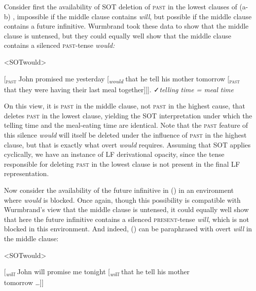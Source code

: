 \documentclass[output=paper]{langscibook}
\begin{document}
Consider first the availability of SOT deletion of \textsc{past }in the lowest clauses of (a-b) , impossible if the middle clause contains \textit{will}, but possible if the middle clause contains a future infinitive. Wurmbrand took these data to show that the middle clause is untensed, but they could equally well show that the middle clause contains a silenced \textsc{past}-tense \textit{would:}

\noindent \noindent \pex<SOTwould>

{[}\textsubscript{\textsc{past}} John promised me yesterday {[}\textsubscript{\textit{would}} that he  tell his mother tomorrow {[}\textsubscript{\textsc{past}} that they were having their last meal together{]]]}. \smallbreak
✓\textit{telling time = meal time}
\xe

On this view, it is \textsc{past} in the middle clause, not \textsc{past }in the highest cause, that deletes \textsc{past }in the lowest clause, yielding the SOT interpretation under which the telling time and the meal-eating time are identical. Note that the \textsc{past }feature of this silence \textit{would} will itself be deleted under the influence of \textsc{past} in the highest clause, but that is exactly what overt \textit{would} requires. Assuming that SOT applies cyclically, we have an instance of LF derivational opacity, since the tense responsible for deleting \textsc{past }in the lowest clause is not present in the final LF representation. 

Now consider the availability of the future infinitive in () in an environment where \textit{would} is blocked. Once again, though this possibility is compatible with Wurmbrand's view that the middle clause is untensed, it could equally well show that here the future infinitive contains a silenced \textsc{present-}tense \textit{will}, which is not blocked in this environment. And indeed, () can be paraphrased with overt \textit{will} in the middle clause:

\pex<SOTwould>

{[}\textsubscript{\textit{will}} John will promise me tonight {[}\textsubscript{\textit{will}} that he  tell his mother \\tomorrow \ldots{]]}
\xe
\end{document}

